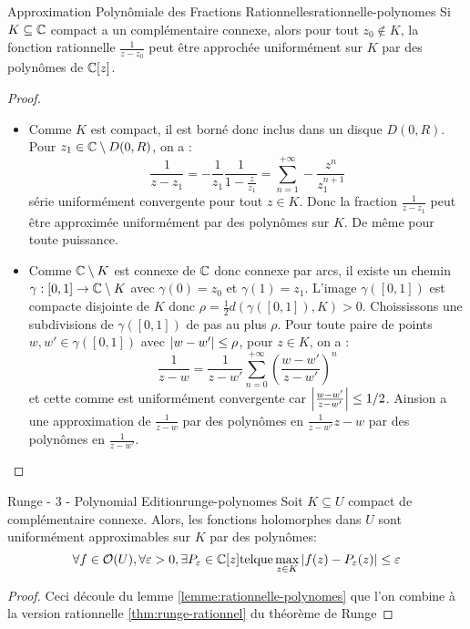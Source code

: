 \documentclass{cours}
\begin{document}
\begin{lemme}{Approximation Polynômiale des Fractions Rationnelles}{rationnelle-polynomes}
	Si $K \subseteq \mathbb{C}$ compact a un complémentaire connexe, alors pour tout $z_{0} \notin K$, la fonction rationnelle $\frac{1}{z - z_{0}}$ peut être approchée uniformément sur $K$ par des polynômes de $\mathbb{C}[z]$. 
\end{lemme}
\begin{proof}
	\begin{itemize}
		\item Comme $K$ est compact, il est borné donc inclus dans un disque $D(0, R)$. Pour $z_{1} \in \mathbb{C} \setminus D(0, R)$, on a : 
			\[
				\frac{1}{z - z_{1}} = - \frac{1}{z_{1}}\frac{1}{1 - \frac{z}{z_{1}}} = \sum_{n = 1}^{+ \infty}-\frac{z^{n}}{z_{1}^{n + 1}}
			\]
			série uniformément convergente pour tout $z \in K$. Donc la fraction $\frac{1}{z - z_{1}}$ peut être approximée uniformément par des polynômes sur $K$. De même pour toute puissance. 
		\item Comme $\mathbb{C} \setminus K$ est connexe de $\mathbb{C}$ donc connexe par arcs, il existe un chemin $\gamma : [0, 1] \to \mathbb{C} \setminus K$ avec $\gamma(0) = z_{0}$ et $\gamma(1) = z_{1}$. L'image $\gamma([0, 1])$ est compacte disjointe de $K$ donc $\rho = \frac{1}{2}d(\gamma([0, 1]), K) > 0$. Choississons une subdivisions de $\gamma([0,1])$ de pas au plus $\rho$. Pour toute paire de points $w, w' \in \gamma([0, 1])$ avec $\left|w - w'\right| \leq \rho$, pour $z \in K$, on a : 
			\[
				\frac{1}{z-w} = \frac{1}{z - w'}\sum_{n = 0}^{+\infty}\left(\frac{w - w'}{z - w'}\right)^{n}
			\]
			et cette comme est uniformément convergente car $\left|\frac{w - w'}{z - w'}\right|\leq 1/2$. Ainsion a une approximation de $\frac{1}{z - w}$ par des polynômes en $\frac{1}{z - w'}{z - w}$ par des polynômes en $\frac{1}{z - w'}$.
	\end{itemize}
\end{proof}

\begin{théorème}{Runge - 3 - Polynomial Edition}{runge-polynomes}
	Soit $K \subseteq U$ compact de complémentaire connexe. Alors, les fonctions holomorphes dans $U$ sont uniformément approximables sur $K$ par des polynômes: 
	\[
		\forall f \in \mathcal{O}(U), \forall \varepsilon > 0, \exists P_{\varepsilon} \in \mathbb{C}[z] \mathrm{ tel que } \max_{z\in K} \left|f(z) - P_{\varepsilon}(z)\right|\leq \varepsilon
	\]
\end{théorème}
\begin{proof}
	Ceci découle du lemme \ref{lemme:rationnelle-polynomes} que l'on combine à la version rationnelle \ref{thm:runge-rationnel} du théorème de Runge
\end{proof}
\end{document}
